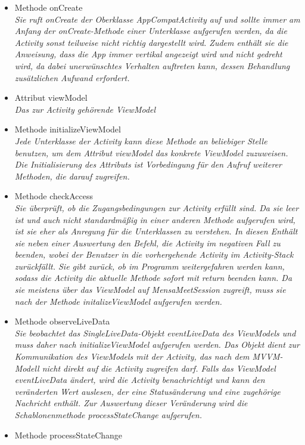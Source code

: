 \documentclass[a4paper]{scrreprt}
\begin{document}
 \begin{itemize}
 \item Methode onCreate \\
 \textit{Sie ruft onCreate der Oberklasse AppCompatActivity auf und sollte immer am Anfang der onCreate-Methode einer Unterklasse aufgerufen werden, da die Activity sonst teilweise nicht richtig dargestellt wird. Zudem enthält sie die Anweisung, dass die App immer vertikal angezeigt wird und nicht gedreht wird, da dabei unerwünschtes Verhalten auftreten kann, dessen Behandlung zusätzlichen Aufwand erfordert.}
\item Attribut viewModel \\
\textit{Das zur Activity gehörende ViewModel}
\item Methode initializeViewModel \\
\textit{Jede Unterklasse der Activity kann diese Methode an beliebiger Stelle benutzen, um dem Attribut viewModel das konkrete ViewModel zuzuweisen. Die Initialisierung des Attributs ist Vorbedingung für den Aufruf weiterer Methoden, die darauf zugreifen.}
\item Methode checkAccess\\
\textit{Sie überprüft, ob die Zugangsbedingungen zur Activity erfüllt sind. Da sie leer ist und auch nicht standardmäßig in einer anderen Methode aufgerufen wird, ist sie eher als Anregung für die Unterklassen zu verstehen. In diesen Enthält sie neben einer Auswertung den Befehl, die Activity im negativen Fall zu beenden, wobei der Benutzer in die vorhergehende Activity im Activity-Stack zurückfällt. Sie gibt zurück, ob im Programm weitergefahren werden kann, sodass die Activity die aktuelle Methode sofort mit return beenden kann. Da sie meistens über das ViewModel auf MensaMeetSession zugreift, muss sie nach der Methode initalizeViewModel aufgerufen werden.}
\item Methode observeLiveData\\
\textit{Sie beobachtet das SingleLiveData-Objekt eventLiveData des ViewModels und muss daher nach initializeViewModel aufgerufen werden. Das Objekt dient zur Kommunikation des ViewModels mit der Activity, das nach dem MVVM-Modell nicht direkt auf die Activity zugreifen darf. Falls das ViewModel eventLiveData ändert, wird die Activity benachrichtigt und kann den veränderten Wert auslesen, der eine Statusänderung und eine zugehörige Nachricht enthält. Zur Auswertung dieser Veränderung wird die Schablonenmethode processStateChange aufgerufen.}
\item Methode processStateChange\\

\end{itemize}
\end{document}
